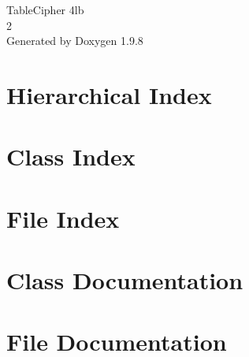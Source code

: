 \documentclass[twoside]{book}
\newcommand{\+}{\discretionary{\mbox{\scriptsize$\hookleftarrow$}}{}{}}
\newcommand{\clearemptydoublepage}{%
    \newpage{\pagestyle{empty}\cleardoublepage}%
  }
\begin{document}
  \raggedbottom
    \hypersetup{pageanchor=false,
                bookmarksnumbered=true,
                pdfencoding=unicode
               }
  \begin{titlepage}
  \vspace*{7cm}
  \begin{center}%
  {\Large Table\+Cipher 4lb}\\
  [1ex]\large 2 \\
  \vspace*{1cm}
  {\large Generated by Doxygen 1.9.8}\\
  \end{center}
  \end{titlepage}
  \clearemptydoublepage
  \tableofcontents
  \clearemptydoublepage
  \hypersetup{pageanchor=true}
\chapter{Hierarchical Index}

\chapter{Class Index}

\chapter{File Index}

\chapter{Class Documentation}


\chapter{File Documentation}




  \backmatter
  \newpage
  \clearemptydoublepage
  \printindex
\end{document}

